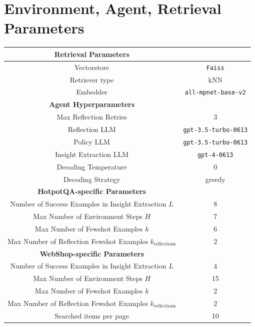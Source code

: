 \documentclass[letterpaper]{article} %
\begin{document}
\section{Environment, Agent, Retrieval Parameters}
\begin{table}[ht]
    \centering

    \begin{tabular}{@{}cc@{}}
        \toprule
        \textbf{Retrieval Parameters}   &   \\ 
        \midrule
        Vectorstore & \texttt{Faiss}    \\
        Retriever type  & kNN   \\
        Embedder    & \texttt{all-mpnet-base-v2}  \\
        \midrule
        \textbf{Agent Hyperparameters}  &   \\
        \midrule
        Max Reflection Retries  &   3   \\
        Reflection LLM  & \texttt{gpt-3.5-turbo-0613}   \\
        Policy LLM  & \texttt{gpt-3.5-turbo-0613}   \\
        Insight Extraction LLM  & \texttt{gpt-4-0613}  \\
        Decoding Temperature  & 0  \\
        Decoding Strategy  & greedy  \\
        \midrule
        \textbf{HotpotQA-specific Parameters}  &   \\ 
        \midrule
        Number of Success Examples in Insight Extraction $L$    & 8   \\
        Max Number of Environment Steps $H$     & 7  \\                        
        Max Number of Fewshot Examples $k$    & 6  \\
        Max Number of Reflection Fewshot Examples $k_\text{reflections}$    & 2  \\
        \midrule
        \textbf{WebShop-specific Parameters}   &   \\ 
        \midrule
        Number of Success Examples in Insight Extraction $L$    & 4  \\
        Max Number of Environment Steps $H$ & 15  \\
        Max Number of Fewshot Examples $k$  & 2  \\
        Max Number of Reflection Fewshot Examples $k_\text{reflections}$    & 2  \\
        Searched items per page & 10 \\

\end{tabular}
\end{table}
\end{document}
